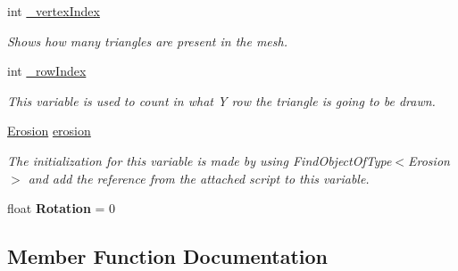 \begin{DoxyCompactItemize}
\mbox{\label{class_assets_1_1_scripts_1_1_mesh_generation_aa2bd3f3971f61a4aac4a03c65db633e2}} 
int \mbox{\hyperlink{class_assets_1_1_scripts_1_1_mesh_generation_aa2bd3f3971f61a4aac4a03c65db633e2}{\+\_\+vertex\+Index}}
\begin{DoxyCompactList}\small\item\em Shows how many triangles are present in the mesh. \end{DoxyCompactList}\item 
\mbox{\label{class_assets_1_1_scripts_1_1_mesh_generation_a1419d5c719c9d53aa7c4d5e8fa7ac2a2}} 
int \mbox{\hyperlink{class_assets_1_1_scripts_1_1_mesh_generation_a1419d5c719c9d53aa7c4d5e8fa7ac2a2}{\+\_\+row\+Index}}
\begin{DoxyCompactList}\small\item\em This variable is used to count in what Y row the triangle is going to be drawn. \end{DoxyCompactList}\item 
\mbox{\label{class_assets_1_1_scripts_1_1_mesh_generation_a000e9fde649beba061d38980768af3fe}} 
\mbox{\hyperlink{class_assets_1_1_scripts_1_1_erosion}{Erosion}} \mbox{\hyperlink{class_assets_1_1_scripts_1_1_mesh_generation_a000e9fde649beba061d38980768af3fe}{erosion}}
\begin{DoxyCompactList}\small\item\em The initialization for this variable is made by using Find\+Object\+Of\+Type$<$\+Erosion$>$ and add the reference from the attached script to this variable. \end{DoxyCompactList}\item 
\mbox{\label{class_assets_1_1_scripts_1_1_mesh_generation_a4c6e5d4af713a15c2d718f0c4a4edac3}} 
float {\bfseries Rotation} = 0
\end{DoxyCompactItemize}


\subsection{Member Function Documentation}
\mbox{\label{class_assets_1_1_scripts_1_1_mesh_generation_a30849dcee23c658732c99ad36d84dc58}} 

